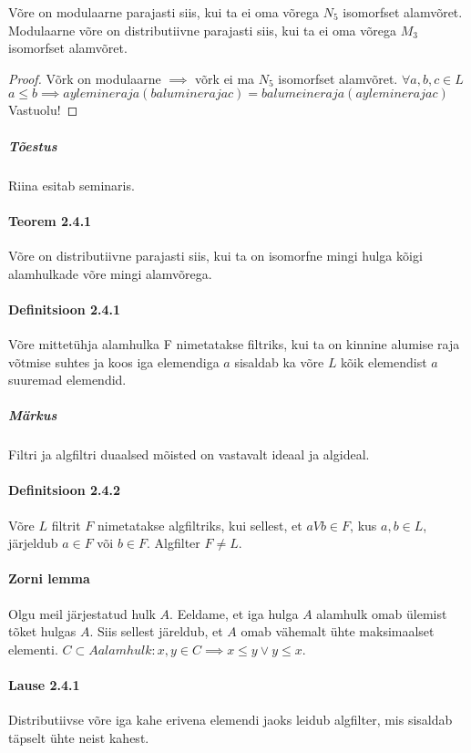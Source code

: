\documentclass[12pt]{report}
\numberwithin{equation}{section}
\theoremstyle{definition}
\theoremstyle{plain}
\begin{document}
Võre on modulaarne parajasti siis, kui ta ei oma võrega $N_5$ isomorfset alamvõret. Modulaarne võre on distributiivne parajasti siis, kui ta ei oma võrega $M_3$ isomorfset alamvõret.

\begin{proof}
Võrk on modulaarne $ \implies $ võrk ei ma $N_5$ isomorfset alamvõret. 
$\forall a,b,c \in L$
$a \leq b \implies a ylemineraja ( b alumine raja c )= b alumeine raja (a ylemine raja c)$ Vastuolu!


\end{proof}

\subparagraph{Tõestus}

Riina esitab seminaris.

\paragraph{Teorem 2.4.1}
Võre on distributiivne parajasti siis, kui ta on isomorfne mingi hulga kõigi alamhulkade võre mingi alamvõrega. 

\paragraph{Definitsioon 2.4.1}
Võre mittetühja alamhulka F nimetatakse filtriks, kui ta on kinnine alumise raja võtmise suhtes ja koos iga elemendiga $a$ sisaldab ka võre $L$ kõik elemendist $a$ suuremad elemendid.

\subparagraph{Märkus}
Filtri ja algfiltri duaalsed mõisted on vastavalt ideaal ja algideal.

\paragraph{Definitsioon 2.4.2}
Võre $L$ filtrit $F$ nimetatakse algfiltriks, kui sellest, et $a V b \in F$, kus $a,b \in L$, järjeldub
$a \in F$ või $b \in F$. Algfilter $F \neq L$. 

\paragraph{Zorni lemma}
Olgu meil järjestatud hulk $A$. Eeldame, et iga hulga $A$ alamhulk omab ülemist tõket hulgas $A$. Siis sellest järeldub, et $A$ omab vähemalt ühte maksimaalset elementi. $C \subset A alamhulk: x,y \in C \implies x \leq y \lor y \leq x$.

\paragraph{Lause 2.4.1}
Distributiivse võre iga kahe erivena elemendi jaoks leidub algfilter, mis sisaldab täpselt ühte neist kahest. 
\end{document}
